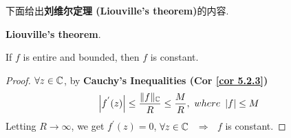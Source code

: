 	\vspace{2em}
	下面给出\textbf{刘维尔定理 (Liouville's theorem)}的内容.
	\begin{corollary}\label{cor 5.2.4}
		\textbf{Liouville's theorem}.
		\begin{center}
			If $f$ is entire and bounded, then $f$ is constant.
		\end{center}
		
		\vspace{2em}
		\begin{proof}
			$\forall z \in \mathbb{C}$, by \textbf{Cauchy's Inequalities (Cor \ref{cor 5.2.3})}
			\begin{align}
				\left| f^{'}(z) \right| \leq \frac{\Vert f \Vert_{\mathbb{C}}}{R} \leq \frac{M}{R} , \,\, where \,\, \left| f \right| \leq M
			\end{align}
			Letting $R \to \infty$, we get $f^{'}(z) = 0$, $\forall z \in \mathbb{C}$ $\,\, \Rightarrow \,\,$ $f$ is constant.
		\end{proof}
	\end{corollary}

\newpage

